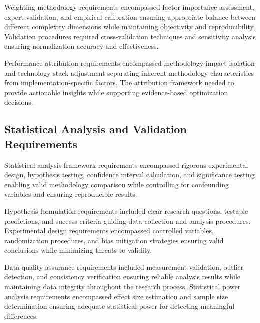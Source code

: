 
Weighting methodology requirements encompassed factor importance assessment, expert validation, and empirical calibration ensuring appropriate balance between different complexity dimensions while maintaining objectivity and reproducibility. Validation procedures required cross-validation techniques and sensitivity analysis ensuring normalization accuracy and effectiveness.

Performance attribution requirements encompassed methodology impact isolation and technology stack adjustment separating inherent methodology characteristics from implementation-specific factors. The attribution framework needed to provide actionable insights while supporting evidence-based optimization decisions.

\subsection{Statistical Analysis and Validation Requirements}

Statistical analysis framework requirements encompassed rigorous experimental design, hypothesis testing, confidence interval calculation, and significance testing enabling valid methodology comparison while controlling for confounding variables and ensuring reproducible results.

Hypothesis formulation requirements included clear research questions, testable predictions, and success criteria guiding data collection and analysis procedures. Experimental design requirements encompassed controlled variables, randomization procedures, and bias mitigation strategies ensuring valid conclusions while minimizing threats to validity.


Data quality assurance requirements included measurement validation, outlier detection, and consistency verification ensuring reliable analysis results while maintaining data integrity throughout the research process. Statistical power analysis requirements encompassed effect size estimation and sample size determination ensuring adequate statistical power for detecting meaningful differences.


